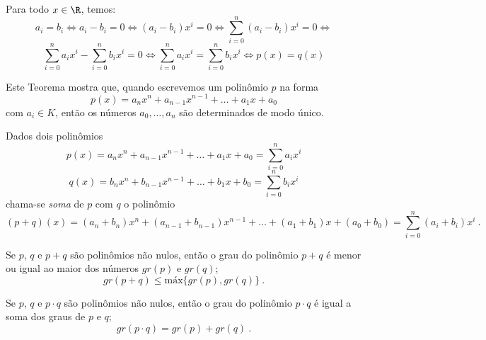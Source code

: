  \begin{dem}
 Para todo $x \in \R$, temos:
\begin{equation}
a_i= b_i \Leftrightarrow a_i - b_i=0 \Leftrightarrow (a_i - b_i)x^i=0 \Leftrightarrow \sum_{i=0}^{n}(a_i - b_i)x^i= 0 \Leftrightarrow
\end{equation}
\begin{equation}
 \sum_{i=0}^{n}a_i x^i - \sum_{i=0}^{n}b_i x^i = 0 \Leftrightarrow \sum_{i=0}^{n}a_i x^i = \sum_{i=0}^{n}b_i x^i \Leftrightarrow p(x)= q(x)
\end{equation}

 \end{dem}

  Este Teorema mostra que, quando escrevemos um polinômio $p$ na forma
\begin{equation}
p(x)= a_nx^n + a_{n-1}x^{n-1}+ \ldots + a_1x+ a_0
\end{equation}
 com $a_i \in K$, então os números $a_0, \ldots, a_n$ são determinados de modo único.

 Dados dois polinômios
\begin{equation}
p(x)= a_nx^n + a_{n-1}x^{n-1}+ \ldots + a_1x+ a_0= \sum_{i=0}^{n} a_ix^i
\end{equation}
\begin{equation}
q(x)= b_nx^n + b_{n-1}x^{n-1}+ \ldots + b_1x+ b_0= \sum_{i=0}^{n} b_ix^i
\end{equation}
  chama-se \emph{soma} de $p$ com $q$ o polinômio
\begin{equation}
(p+q)(x)= (a_n+ b_n)x^n + (a_{n-1}+b_{n-1})x^{n-1}+ \ldots + (a_1+b_1)x+ (a_0+b_0)= \sum_{i=0}^{n} (a_i+b_i)x^i \ .
\end{equation}

  \begin{teo}
  Se $p$, $q$ e $p+q$ são polinômios não nulos, então o grau do polinômio $p+q$ é menor ou igual ao maior dos números $gr(p)$ e $gr(q)$;
\begin{equation}
gr(p+q) \leq \text{máx}\{gr(p), gr(q)\} \ .
\end{equation}
  \end{teo}

  \begin{teo}
  Se $p$, $q$ e $p \cdot q$ são polinômios não nulos, então o grau do polinômio $p \cdot q$ é igual a soma dos graus de $p$ e $q$;
\begin{equation}
gr(p \cdot q) = gr(p) + gr(q) \ .
\end{equation}
  \end{teo}

